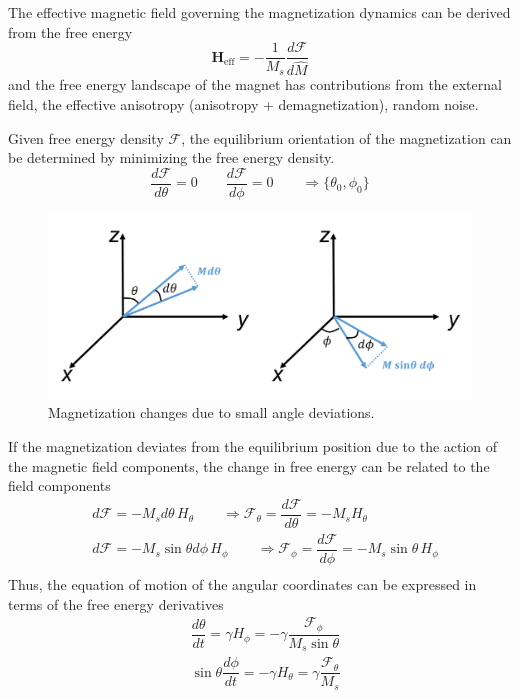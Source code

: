 \documentclass[aps,prb,onecolumn,notitlepage,showpacs,floatfix,superscriptaddress]{revtex4-1}
\newcommand{\mrm}[1]{\mathrm{#1}}
\newcommand{\sint}{\sin\theta}
\newcommand{\fe}{ \mathcal{F}}
\begin{document}
The effective magnetic field governing the magnetization dynamics can be derived from the free energy
\begin{equation}
{\bm H}_\mrm{eff} = -\dfrac{1}{M_s} \dfrac{d\fe}{d{\hat{M}}}
\end{equation}
and the free energy landscape of the magnet has contributions from the external field, the effective anisotropy (anisotropy + demagnetization), random noise. 

Given free energy density $\fe$, the equilibrium orientation of the magnetization can be determined by minimizing the free energy density.
\begin{equation}
\dfrac{d\fe}{d\theta} = 0 \qquad \dfrac{d\fe}{d\phi}=0 \qquad \Rightarrow \{\theta_0,\phi_0\}
\end{equation}
\begin{figure}[hbtp]
\centering
\includegraphics[scale=0.4]{MChange.png}
\caption{Magnetization changes due to small angle deviations.}
\end{figure}
If the magnetization deviates from the equilibrium position due to the action of the magnetic field components, the change in free energy can be related to the field components
\begin{equation}
\begin{split}
&d\fe=-M_s d\theta \, H_\theta  \qquad \Rightarrow \fe_\theta = \dfrac{d\fe}{d\theta} = -M_s H_\theta \\
&d\fe=-M_s \sint d\phi \, H_\phi  \qquad \Rightarrow \fe_\phi = \dfrac{d\fe}{d\phi} = -M_s \sint \, H_\phi \\
\end{split}
\end{equation}
Thus, the equation of motion of the angular coordinates can be expressed in terms of the free energy derivatives
\begin{equation}
\begin{split}
&\dfrac{d\theta}{dt} = \gamma H_\phi = -\gamma \dfrac{\fe_\phi}{M_s \sint} \\
&\sint \dfrac{d\phi}{dt} = -\gamma H_\theta = \gamma \dfrac{\fe_\theta}{M_s}
\end{split}
\end{equation}
\end{document}
